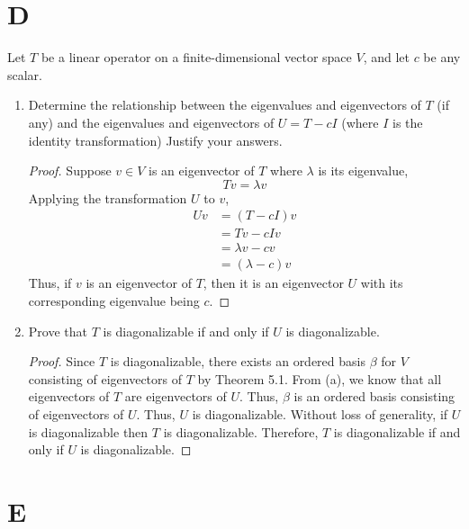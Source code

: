 \documentclass[11pt]{scrartcl}
\begin{document}
\section{D}
Let $T$ be a linear operator on a finite-dimensional vector space $V$, and let $c$ be any scalar.
\begin{enumerate}[label=\alph*.]
	\item{
	      Determine the relationship between the eigenvalues and eigenvectors of $T$ (if any) and the eigenvalues and
	      eigenvectors of $U = T - cI$ (where $I$ is the identity transformation) Justify your answers.
	      \begin{proof}
		      Suppose $v \in V$ is an eigenvector of $T$ where $\lambda$ is its eigenvalue,
		      $$Tv = \lambda v$$
		      Applying the transformation $U$ to $v$,
		      \begin{align*}
			      Uv & = (T - cI)v      \\
			         & = Tv - cIv       \\
			         & = \lambda v - cv \\
			         & = (\lambda - c)v
		      \end{align*}
		      Thus, if $v$ is an eigenvector of $T$, then it is an eigenvector $U$ with its corresponding
		      eigenvalue being $c$.
	      \end{proof}
	      }
	\item{
	      Prove that $T$ is diagonalizable if and only if $U$ is diagonalizable.
	      \begin{proof}
		      Since $T$ is diagonalizable, there exists an ordered basis $\beta$ for $V$
		      consisting of eigenvectors of $T$ by Theorem 5.1.
			  From (a), we know that all eigenvectors of $T$ are eigenvectors of $U$.
			  Thus, $\beta$ is an ordered basis consisting of eigenvectors of $U$.
			  Thus, $U$ is diagonalizable. Without loss of generality, if $U$ is diagonalizable
			  then $T$ is diagonalizable. Therefore, $T$ is diagonalizable if and only if $U$ is diagonalizable.

	      \end{proof}
	      }
\end{enumerate}

\section{E}






\end{document}
